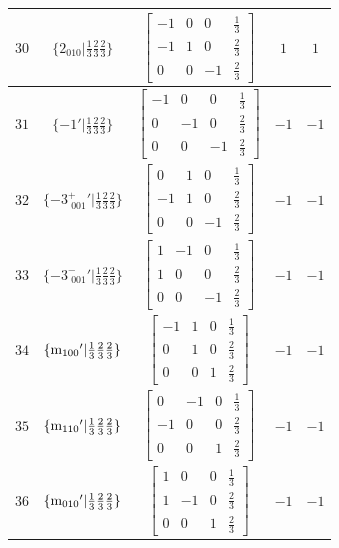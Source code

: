 \documentclass[fleqn,8pt]{jsarticle}
\begin{document}
\begin{longtable}{ccccc}
$ 30 $ & $ \{2{}_{010}|\frac{1}{3} \frac{2}{3} \frac{2}{3}\} $ & $ \begin{bmatrix} -1 & 0 & 0 & \frac{1}{3} \\ -1 & 1 & 0 & \frac{2}{3} \\ 0 & 0 & -1 & \frac{2}{3} \end{bmatrix} $ & $ 1 $ & $ 1 $ \\ \hline
$ 31 $ & $ \{-1{}'|\frac{1}{3} \frac{2}{3} \frac{2}{3}\} $ & $ \begin{bmatrix} -1 & 0 & 0 & \frac{1}{3} \\ 0 & -1 & 0 & \frac{2}{3} \\ 0 & 0 & -1 & \frac{2}{3} \end{bmatrix} $ & $ -1 $ & $ -1 $ \\ \hline
$ 32 $ & $ \{-3^{+}_{\,\,001}{}'|\frac{1}{3} \frac{2}{3} \frac{2}{3}\} $ & $ \begin{bmatrix} 0 & 1 & 0 & \frac{1}{3} \\ -1 & 1 & 0 & \frac{2}{3} \\ 0 & 0 & -1 & \frac{2}{3} \end{bmatrix} $ & $ -1 $ & $ -1 $ \\ \hline
$ 33 $ & $ \{-3^{-}_{\,\,001}{}'|\frac{1}{3} \frac{2}{3} \frac{2}{3}\} $ & $ \begin{bmatrix} 1 & -1 & 0 & \frac{1}{3} \\ 1 & 0 & 0 & \frac{2}{3} \\ 0 & 0 & -1 & \frac{2}{3} \end{bmatrix} $ & $ -1 $ & $ -1 $ \\ \hline
$ 34 $ & $ \{{\rm m}_{100}{}'|\frac{1}{3} \frac{2}{3} \frac{2}{3}\} $ & $ \begin{bmatrix} -1 & 1 & 0 & \frac{1}{3} \\ 0 & 1 & 0 & \frac{2}{3} \\ 0 & 0 & 1 & \frac{2}{3} \end{bmatrix} $ & $ -1 $ & $ -1 $ \\ \hline
$ 35 $ & $ \{{\rm m}_{110}{}'|\frac{1}{3} \frac{2}{3} \frac{2}{3}\} $ & $ \begin{bmatrix} 0 & -1 & 0 & \frac{1}{3} \\ -1 & 0 & 0 & \frac{2}{3} \\ 0 & 0 & 1 & \frac{2}{3} \end{bmatrix} $ & $ -1 $ & $ -1 $ \\ \hline
$ 36 $ & $ \{{\rm m}_{010}{}'|\frac{1}{3} \frac{2}{3} \frac{2}{3}\} $ & $ \begin{bmatrix} 1 & 0 & 0 & \frac{1}{3} \\ 1 & -1 & 0 & \frac{2}{3} \\ 0 & 0 & 1 & \frac{2}{3} \end{bmatrix} $ & $ -1 $ & $ -1 $ \\
\end{longtable}
\end{document}
